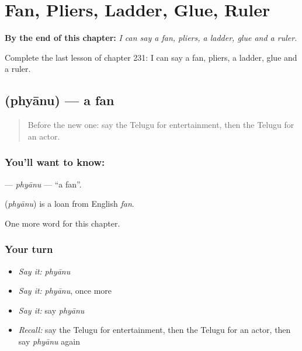 
\chapter{Fan, Pliers, Ladder, Glue, Ruler}
\label{ch:te-fan-pliers-ladder-glue-ruler}

\begin{chapteropening}
\textbf{By the end of this chapter:} \emph{I can say a fan, pliers, a ladder, glue and a ruler.}

Complete the last lesson of chapter 231: I can say a fan, pliers, a ladder, glue and a ruler.
\end{chapteropening}

\section[\texorpdfstring{\te{ఫ్యాను} (phyānu)}{ఫ్యాను (phyānu)}]{ (phyānu) — a fan}

\label{lesson:TE-C231-phyanu}



\begin{quote}
Before the new one: say the Telugu for entertainment, then the Telugu for an actor.
\end{quote}

\subsection*{You'll want to know: }
\textbf{} — \emph{phyānu} — \textquotedblleft{}a fan\textquotedblright{}.

\begin{cousinweb}
\textbf{} (\emph{phyānu}) is a loan from English \emph{fan}.
\end{cousinweb}

\begin{grammarlens}[title={What you've built}]
One more word for this chapter.
\end{grammarlens}

\subsection*{Your turn}
\begin{itemize}
\raggedright
  \item \emph{Say it:} \emph{phyānu}
  \item \emph{Say it:} \emph{phyānu}, once more
  \item \emph{Say it:} say \emph{phyānu}
  \item \emph{Recall:} say the Telugu for entertainment, then the Telugu for an actor, then say \emph{phyānu} again
\end{itemize}

